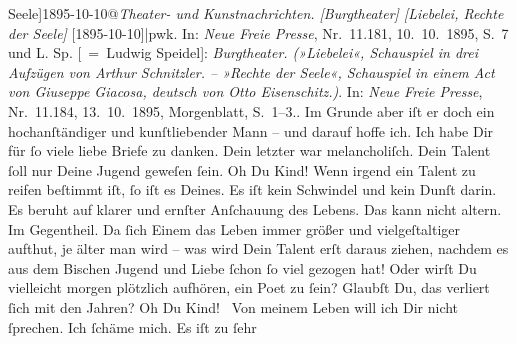 \begin{ledgroupsized}[t]{13cm}
{{{{                  Seele]1895-10-10@\emph{Theater- und Kunstnachrichten. [Burgtheater] [Liebelei, Rechte der Seele]} {[}1895-10-10{]}|pwk}. In: \emph{Neue Freie
                        Presse}, Nr. 11.181, 10. 10. 1895,
                     S. 7 und L. Sp. [ = Ludwig Speidel]: \emph{Burgtheater. (»Liebelei«, Schauspiel in drei Aufzügen von
                        Arthur Schnitzler. – »Rechte der Seele«, Schauspiel in einem Act von
                        Giuseppe Giacosa, deutsch von Otto Eisenschitz.)}. In: \emph{Neue Freie Presse}, Nr. 11.184, 13. 10. 1895, Morgenblatt, S. 1–3.}}}\label{K_L02762-8h}. Im Grunde {\pb}aber iſt er doch ein hochanſtändiger und
               kunſtliebender Mann – und darauf hoffe ich.\pend
           \pstart
           Ich habe Dir für ſo viele liebe Briefe zu danken. Dein letzter war melancholiſch.
               Dein Talent ſoll nur Deine Jugend geweſen ſein. Oh Du Kind! Wenn irgend ein Talent zu
               reifen beſtimmt iſt, ſo iſt es Deines. Es iſt kein Schwindel und kein Dunſt darin. Es
               beruht auf klarer {\pb}und  ernſter Anſchauung des Lebens.  Das
               kann nicht altern. Im Gegentheil. Da ſich Einem das Leben immer größer und
               vielgeſtaltiger aufthut, je älter man wird – was wird Dein Talent erſt daraus ziehen,
                   nachdem es aus dem Bischen Jugend und Liebe
               ſchon ſo viel gezogen hat! Oder wirſt Du vielleicht morgen plötzlich {\pb}aufhören, ein Poet zu ſein? Glaubſt Du, das verliert
               ſich mit den Jahren? Oh Du Kind! {\dotsfive}\pend
           \pstart
           Von meinem Leben will ich Dir nicht ſprechen. Ich ſchäme mich. Es iſt zu ſehr

\end{ledgroupsized}

